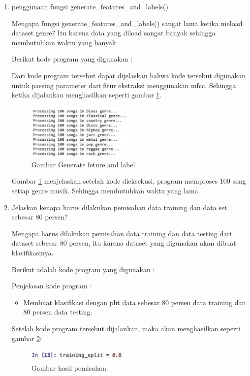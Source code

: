 \begin{enumerate}
\item penggunaan fungsi generate\_features\_and\_labels()
	\par Mengapa fungsi generate\_features\_and\_labels() sangat lama ketika meload dataset genre? Itu karena data yang diload sangat banyak sehingga membutuhkan waktu yang banyak
	\par Berikut kode program yang digunakan :
	
	\par Dari kode program tersebut dapat dijelaskan bahwa kode tersebut digunakan untuk passing parameter dari fitur ekstraksi menggunakan mfcc. Sehingga ketika dijalankan menghasilkan seperti gambar \ref{no13}.
		\begin{figure}[ht]
		\centerline{\includegraphics[width=0.5\textwidth]{figures/chapter6/no13.jpg}}
		\caption{Gambar Generate feture and label.}
		\label{no13}
		\end{figure}
	\par Gambar \ref{no13} menjelaskan setelah kode dieksekusi, program memproses 100 song setiap genre musik. Sehingga membutuhkan waktu yang lama.

\item Jelaskan kenapa harus dilakukan pemisahan data training dan data set sebesar 80 persen?
	\par Mengapa harus dilakukan pemisahan data training dan data testing dari dataset sebesar 80 persen, itu karena dataset yang digunakan akan dibuat klasifikasinya.
	\par Berikut adalah kode program yang digunakan :
	
	\par Penjelasan kode program :
	\begin{itemize}
	\item Membuat klasifikasi dengan plit data sebesar 80 persen data training dan 80 persen data testing.
	\end{itemize}
	
	\par Setelah kode program tersebut dijalankan, maka akan menghasilkan seperti gambar \ref{no14}:
	
		\begin{figure}[ht]
		\centerline{\includegraphics[width=0.5\textwidth]{figures/chapter6/no14.jpg}}
		\caption{Gambar hasil pemisahan.}
		\label{no14}
		\end{figure}


\end{enumerate}
